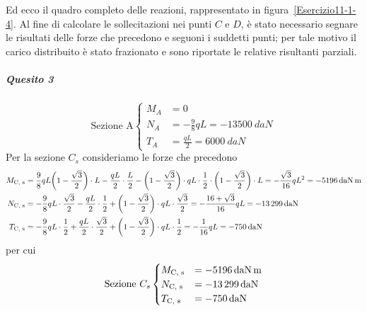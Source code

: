 Ed ecco il quadro completo delle reazioni, rappresentato in figura~\ref{Esercizio11-1-4}. Al fine di calcolare le sollecitazioni nei punti $C$ e $D$, è stato necessario segnare le risultati delle forze che precedono e seguoni i suddetti punti; per tale motivo il carico distribuito è stato frazionato e sono riportate le relative risultanti parziali.
\subparagraph{Quesito 3}
\begin{equation*}
\text{Sezione A} 
\begin{cases}
M_{A} &= 0 \\
N_{A} &= - \frac{9}{8}qL = - \SI{13500}{daN} \\
T_{A} & = \frac{qL}{2}    = \SI{6000}{daN}
\end{cases}
\end{equation*}
Per la sezione $C_s$ consideriamo le forze che precedono
\begin{align*}
M_{\textup{C, s}} &= \frac{9}{8}qL \biggl( 1 - \frac{\sqrt{3}}{2} \biggr)\cdot L - \frac{qL}{2}\cdot \frac{L}{2} - \biggl( 1 - \frac{\sqrt{3}}{2} \biggr)\cdot qL \cdot \frac{1}{2} \cdot \biggl( 1 - \frac{\sqrt{3}}{2} \biggr) \cdot L = -\frac{\sqrt{3}}{16} qL^{2} = - \SI{5196}{daN.m} \\
N_{\textup{C, s}} &= -\frac{9}{8}qL \cdot \frac{\sqrt{3}}{2} - \frac{qL}{2}\cdot \frac{1}{2} + \biggl( 1 - \frac{\sqrt{3}}{2} \biggr) \cdot qL \cdot\frac{\sqrt{3}}{2} = - \frac{16+\sqrt{3}}{16} qL = - \SI{13299}{daN} \\
T_{\textup{C, s}} &=  -\frac{9}{8}qL \cdot \frac{1}{2} + \frac{qL}{2}\cdot \frac{\sqrt{3}}{2} + \biggl( 1 - \frac{\sqrt{3}}{2} \biggr)\cdot qL \cdot \frac{1}{2} = -\frac{1}{16}qL = -\SI{750}{daN}
\end{align*}
per cui 
\begin{equation*}
\text{Sezione } C_{s} 
\begin{cases}
M_{\textup{C, s}} &=  - \SI{5196}{daN.m} \\
N_{\textup{C, s}} &=  - \SI{13299}{daN} \\
T_{\textup{C, s}} & = -\SI{750}{daN}
\end{cases}
\end{equation*}
